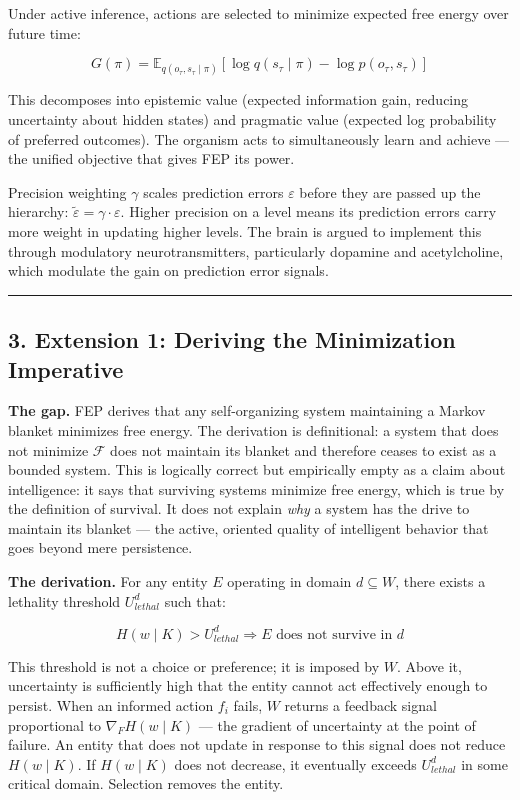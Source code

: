 \documentclass[
]{article}
\begin{document}
Under active inference, actions are selected to minimize expected free
energy over future time:

\[G(\pi) = \mathbb{E}_{q(o_\tau, s_\tau \mid \pi)}[\log q(s_\tau \mid \pi)
- \log p(o_\tau, s_\tau)]\]

This decomposes into epistemic value (expected information gain,
reducing uncertainty about hidden states) and pragmatic value (expected
log probability of preferred outcomes). The organism acts to
simultaneously learn and achieve --- the unified objective that gives
FEP its power.

Precision weighting \(\gamma\) scales prediction errors \(\varepsilon\)
before they are passed up the hierarchy:
\(\tilde{\varepsilon} = \gamma \cdot \varepsilon\). Higher precision on
a level means its prediction errors carry more weight in updating higher
levels. The brain is argued to implement this through modulatory
neurotransmitters, particularly dopamine and acetylcholine, which
modulate the gain on prediction error signals.

\begin{center}\rule{0.5\linewidth}{0.5pt}\end{center}

\subsection{3. Extension 1: Deriving the Minimization
Imperative}\label{extension-1-deriving-the-minimization-imperative}

\textbf{The gap.} FEP derives that any self-organizing system
maintaining a Markov blanket minimizes free energy. The derivation is
definitional: a system that does not minimize \(\mathcal{F}\) does not
maintain its blanket and therefore ceases to exist as a bounded system.
This is logically correct but empirically empty as a claim about
intelligence: it says that surviving systems minimize free energy, which
is true by the definition of survival. It does not explain \emph{why} a
system has the drive to maintain its blanket --- the active, oriented
quality of intelligent behavior that goes beyond mere persistence.

\textbf{The derivation.} For any entity \(E\) operating in domain
\(d \subseteq W\), there exists a lethality threshold \(U_{lethal}^d\)
such that:

\[H(w \mid K) > U_{lethal}^d \Rightarrow E \text{ does not survive in } d\]

This threshold is not a choice or preference; it is imposed by \(W\).
Above it, uncertainty is sufficiently high that the entity cannot act
effectively enough to persist. When an informed action \(f_i\) fails,
\(W\) returns a feedback signal proportional to \(\nabla_F H(w \mid K)\)
--- the gradient of uncertainty at the point of failure. An entity that
does not update in response to this signal does not reduce
\(H(w \mid K)\). If \(H(w \mid K)\) does not decrease, it eventually
exceeds \(U_{lethal}^d\) in some critical domain. Selection removes the
entity.
\end{document}
